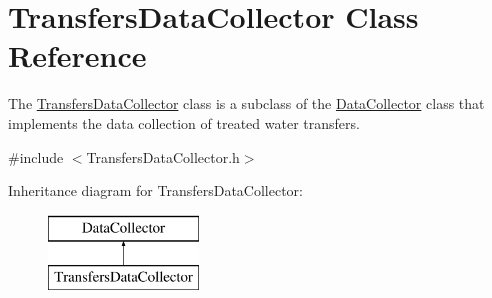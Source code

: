 \hypertarget{classTransfersDataCollector}{}\section{Transfers\+Data\+Collector Class Reference}
\label{classTransfersDataCollector}


The {\ttfamily \mbox{\hyperlink{classTransfersDataCollector}{Transfers\+Data\+Collector}}} class is a subclass of the {\ttfamily \mbox{\hyperlink{classDataCollector}{Data\+Collector}}} class that implements the data collection of treated water transfers.  




{\ttfamily \#include $<$Transfers\+Data\+Collector.\+h$>$}

Inheritance diagram for Transfers\+Data\+Collector\+:\begin{figure}[H]
\begin{center}
\leavevmode
\includegraphics[height=2.000000cm]{classTransfersDataCollector}
\end{center}
\end{figure}
